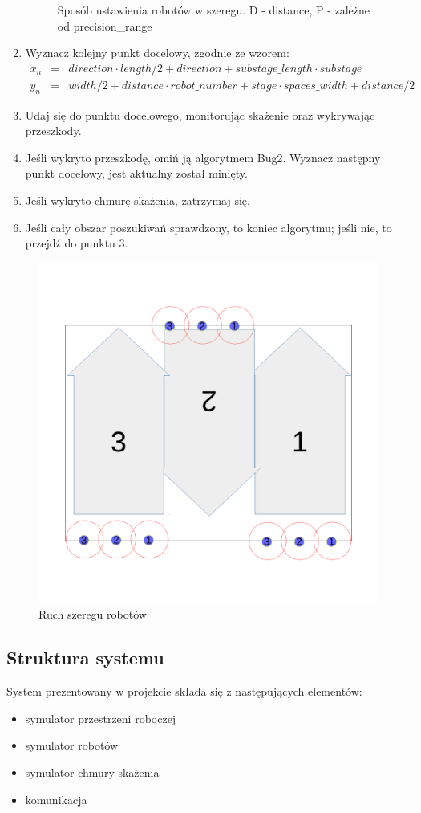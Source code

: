 \documentclass[a4paper, 12pt]{article}
\begin{document}
\begin{enumerate}
\begin{figure}[h!]
			\caption{Sposób ustawienia robotów w szeregu. D - distance, P - zależne od precision\_range}
			\label{odleglosci}
		\end{figure}
		\item Wyznacz kolejny punkt docelowy, zgodnie ze wzorem:
		\begin{eqnarray}
		x_n &=& direction \cdot length / 2 + direction + substage\_length \cdot substage\nonumber\\
		y_n &=& width / 2 + distance \cdot robot\_number + stage \cdot spaces\_width + distance / 2\nonumber
		\end{eqnarray}
		\item Udaj się do punktu docelowego, monitorując skażenie oraz wykrywając przeszkody.
		\item Jeśli wykryto przeszkodę, omiń ją algorytmem Bug2. Wyznacz następny punkt docelowy, jest aktualny został minięty.
		\item Jeśli wykryto chmurę skażenia, zatrzymaj się.
		\item Jeśli cały obszar poszukiwań sprawdzony, to koniec algorytmu; jeśli nie, to przejdź do punktu 3.
		\end{enumerate}
		\begin{figure}[h!]
			\centering
			\includegraphics*[width=0.7\columnwidth]{img/ruch.pdf}
			\caption{Ruch szeregu robotów}
			\label{ruch}
		\end{figure}
		
	
	\subsection{Struktura systemu}
	System prezentowany w projekcie składa się z następujących elementów:
	\begin{itemize}
	\item symulator przestrzeni roboczej	
	\item symulator robotów
	\item symulator chmury skażenia	
	\item komunikacja
	\end{itemize}
	
\end{document}

